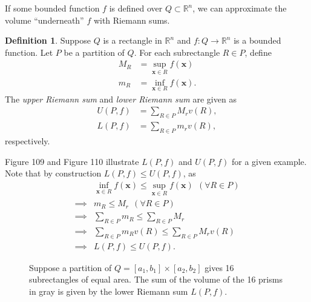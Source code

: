 \documentclass{article}
\newcommand{\R}{\mathbb{R}}
\newcommand{\x}{\mathbf{x}}
\theoremstyle{definition}
\newtheorem{definition}{Definition}[section]
\begin{document}
	If some bounded function $ f $ is defined over $ Q\subset \R^n $, we can approximate the volume ``underneath'' $ f $ with Riemann sums.
	\begin{definition}
		Suppose $ Q $ is a rectangle in $ \R^n $ and $ f:Q\to \R^n $ is a bounded function. Let $ P $ be a partition of $ Q $. For each subrectangle  $ R\in P $, define 
		\begin{align*}
			M_R &= \sup_{\x\in R}f(\x)\\
			m_R &= \inf_{\x\in R}f(\x).
		\end{align*}
	The \textit{\color{red}upper Riemann sum} and \textit{\color{red}lower Riemann sum} are given as 
	\begin{align*}
		U(P,f)&=\sum_{R\in P} M_r v(R),\\
		L(P,f)&=\sum_{R\in P} m_r  v(R),
	\end{align*}
	respectively.
	\end{definition} 
Figure 109 and Figure 110 illustrate $ L(P,f) $ and $ U(P,f) $ for a given example. Note that by construction $ L(P,f)\le U(P,f) $, as 
\begin{align*}
	&\inf_{\x\in R}f(\x) \le \sup_{\x\in R}f(\x) \ \  (\forall R\in P)\\
	\implies & m_R \le M_r \ \ (\forall R\in P) \\ 
	\implies & \sum_{R\in P} m_R \le\sum_{R\in P}  M_r \\ 
	\implies & \sum_{R\in P} m_R v(R)\le\sum_{R\in P}  M_r v(R)\\
	\implies & L(P,f) \le U(P,f).\end{align*}
\begin{figure}[h!]
	\centering
	\caption{Suppose a partition of $ Q=[a_1,b_1]\times [a_2,b_2] $ gives 16 subrectangles of equal area. The sum of the volume of the 16 prisms in gray is given by the lower Riemann sum $ L(P,f) $. }
\end{figure}
\end{document}
